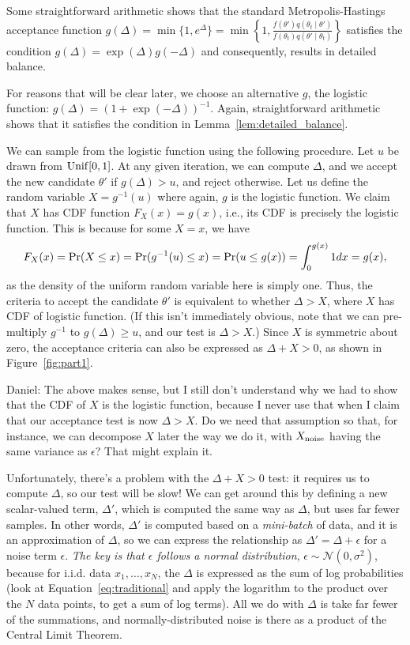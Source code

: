 \documentclass{article}
\begin{document}
Some straightforward arithmetic shows that the standard Metropolis-Hastings acceptance function
$g(\Delta) = \min\{1, e^\Delta \} = \min\left\{1, \frac{f(\theta')q(\theta_t \mid \theta')}{f(\theta_t)q(\theta' \mid
\theta_t)}\right\}$ satisfies the condition $g(\Delta) =
\exp(\Delta)g(-\Delta)$ and consequently, results in detailed balance.

For reasons that will be clear later, we choose an alternative $g$, the logistic function:
$g(\Delta) = (1+\exp(-\Delta))^{-1}$. Again, straightforward arithmetic shows that it satisfies the
condition in Lemma~\ref{lem:detailed_balance}.

We can sample from the logistic function using the following procedure. Let $u$ be drawn from ${\rm
Unif}[0,1]$. At any given iteration, we can compute $\Delta$, and we accept the new candidate
$\theta'$ if $g(\Delta) > u$, and reject otherwise. Let us define the random variable $X =
g^{-1}(u)$ where again, $g$ is the logistic function. We claim that $X$ has CDF function $F_X(x) =
g(x)$, i.e., its CDF is precisely the logistic function. This is because for some $X = x$, we have
\[
F_X(x) = {\rm Pr}(X \le x) = {\rm Pr}(g^{-1}(u) \le x) = {\rm Pr}(u \le g(x)) = \int_{0}^{g(x)} 1 dx = g(x),
\]
as the density of the uniform random variable here is simply one. Thus, the criteria to accept the
candidate $\theta'$ is equivalent to whether $\Delta > X$, where $X$ has CDF of logistic function.
(If this isn't immediately obvious, note that we can pre-multiply $g^{-1}$ to $g(\Delta) \ge u$, and
our test is $\Delta > X$.) Since $X$ is symmetric about zero, the acceptance criteria can also be
expressed as $\Delta + X>0$, as shown in Figure~\ref{fig:part1}.

{\color{blue}
Daniel: The above makes sense, but I still don't understand why we had to show that the CDF of $X$
is the logistic function, because I never use that when I claim that our acceptance test is now
$\Delta > X$.  Do we need that assumption so that, for instance, we can decompose $X$ later the way
we do it, with $X_{\rm noise}$ having the same variance as $\epsilon$? That might explain it.
}

Unfortunately, there's a problem with the $\Delta + X > 0$ test: it requires us to compute $\Delta$,
so our test will be slow! We can get around this by defining a new scalar-valued term, $\Delta'$, which is
computed the same way as $\Delta$, but uses far fewer samples. In other words, $\Delta'$ is computed
based on a \emph{mini-batch} of data, and it is an approximation of $\Delta$, so we can express the
relationship as $\Delta' = \Delta + \epsilon$ for a noise term $\epsilon$. \emph{The key is that
$\epsilon$ follows a normal distribution}, $\epsilon \sim \mathcal{N}(0, \sigma^2)$, because for i.i.d. data $x_1, \ldots, x_N$, the $\Delta$
is expressed as the sum of log probabilities (look at Equation~\ref{eq:traditional} and apply the
logarithm to the product over the $N$ data points, to get a sum of log terms). All we do with
$\Delta$ is take far fewer of the summations, and normally-distributed noise is there as a product
of the Central Limit Theorem.
\end{document}

